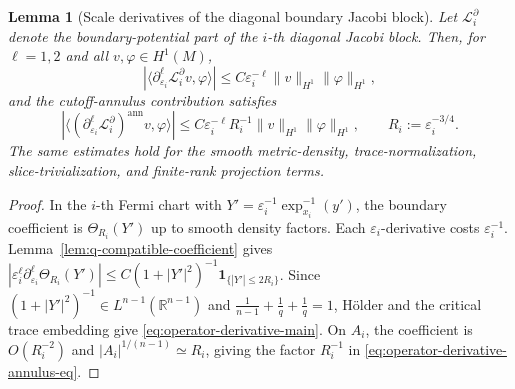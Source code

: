 \documentclass[11pt,reqno,a4paper]{amsart}
\numberwithin{equation}{section}
\theoremstyle{plain}
\newtheorem{lemma}[theorem]{Lemma}
\theoremstyle{remark}
\theoremstyle{plain}
\begin{document}
\begin{lemma}[Scale derivatives of the diagonal boundary Jacobi block]
\label{lem:operator-derivative-annulus}
Let $\mathcal L_i^\partial$ denote the boundary-potential part of the $i$-th
diagonal Jacobi block.  Then, for $\ell=1,2$ and all $v,\varphi\in H^1(M)$,
\begin{equation}\label{eq:operator-derivative-main}
\left|\langle\partial_{\varepsilon_i}^{\ell}\mathcal L_i^\partial v,\varphi\rangle\right|
\le C\varepsilon_i^{-\ell}\|v\|_{H^1}\|\varphi\|_{H^1},
\end{equation}
and the cutoff-annulus contribution satisfies
\begin{equation}\label{eq:operator-derivative-annulus-eq}
\left|\langle(\partial_{\varepsilon_i}^{\ell}\mathcal L_i^\partial)^{\mathrm{ann}}v,\varphi\rangle\right|
\le C\varepsilon_i^{-\ell}R_i^{-1}\|v\|_{H^1}\|\varphi\|_{H^1},
\qquad R_i:=\varepsilon_i^{-3/4}.
\end{equation}
The same estimates hold for the smooth metric-density, trace-normalization,
slice-trivialization, and finite-rank projection terms.
\end{lemma}

\begin{proof}
In the $i$-th Fermi chart with $Y'=\varepsilon_i^{-1}\exp_{x_i}^{-1}(y')$,
the boundary coefficient is $\Theta_{R_i}(Y')$ up to smooth density factors.
Each $\varepsilon_i$-derivative costs $\varepsilon_i^{-1}$.
Lemma~\ref{lem:q-compatible-coefficient} gives
$|\varepsilon_i^\ell\partial_{\varepsilon_i}^\ell\Theta_{R_i}(Y')|
\le C(1+|Y'|^2)^{-1}\mathbf 1_{\{|Y'|\le2R_i\}}$.
Since $(1+|Y'|^2)^{-1}\in L^{n-1}(\mathbb R^{n-1})$ and
$\frac{1}{n-1}+\frac{1}{q}+\frac{1}{q}=1$,
H\"older and the critical trace embedding give \eqref{eq:operator-derivative-main}.
On $A_i$, the coefficient is $O(R_i^{-2})$ and $|A_i|^{1/(n-1)}\simeq R_i$,
giving the factor $R_i^{-1}$ in \eqref{eq:operator-derivative-annulus-eq}.
\end{proof}

\end{document}
